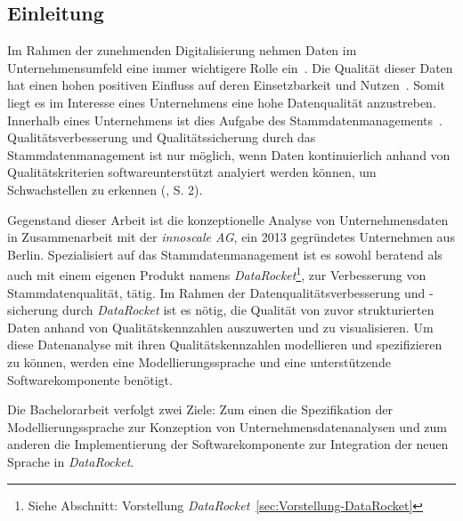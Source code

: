 \documentclass[
  language=german, %
  type=bachelor,%
  ngerman
]{isthesis}
\begin{document}
\begin{content}



  \chapter{Einleitung}


	Im Rahmen der zunehmenden Digitalisierung nehmen Daten im Unternehmensumfeld
	eine immer wichtigere Rolle ein~\cite[][]{otto2016datenqualitat}. Die
	Qualität dieser Daten hat einen hohen positiven Einfluss auf deren
	Einsetzbarkeit und Nutzen~\cite[][]{naumann2007datenqualitat,
	helfert2000massnahmen}. Somit liegt es im Interesse eines Unternehmens eine
	hohe Datenqualität anzustreben. Innerhalb eines Unternehmens ist dies Aufgabe
	des Stammdatenmanagements~\cite[][]{legner2007stammdaten}.
	Qualitätsverbesserung und Qualitätssicherung durch das Stammdatenmanagement
	ist nur möglich, wenn Daten kontinuierlich anhand von Qualitätskriterien
	softwareunterstützt analyiert werden können, um Schwachstellen zu erkennen
	(\cite{baghi2013controlling}, S. 2).

  Gegenstand dieser Arbeit ist die konzeptionelle Analyse von Unternehmensdaten
  in Zusammenarbeit mit der \textit{innoscale AG}, ein 2013 gegründetes
  Unternehmen aus Berlin.  Spezialisiert auf das Stammdatenmanagement ist es
  sowohl beratend als auch mit einem eigenen Produkt namens
  \textit{DataRocket}\footnote{Siehe Abschnitt: Vorstellung
  \textit{DataRocket}~\ref{sec:Vorstellung-DataRocket}}, zur Verbesserung von
  Stammdatenqualität, tätig. Im Rahmen der Datenqualitätsverbesserung und
  -sicherung durch \textit{DataRocket} ist es nötig, die Qualität von zuvor
  strukturierten Daten anhand von Qualitätskennzahlen auszuwerten und zu
  visualisieren. Um diese Datenanalyse mit ihren Qualitätskennzahlen
  modellieren und spezifizieren zu können, werden eine Modellierungssprache und
  eine unterstützende Softwarekomponente benötigt.

  Die Bachelorarbeit verfolgt zwei Ziele: Zum einen die Spezifikation der
  Modellierungssprache zur Konzeption von Unternehmensdatenanalysen und zum
  anderen die Implementierung der Softwarekomponente zur Integration der neuen
  Sprache in \textit{DataRocket}.


\end{content}
\end{document}

